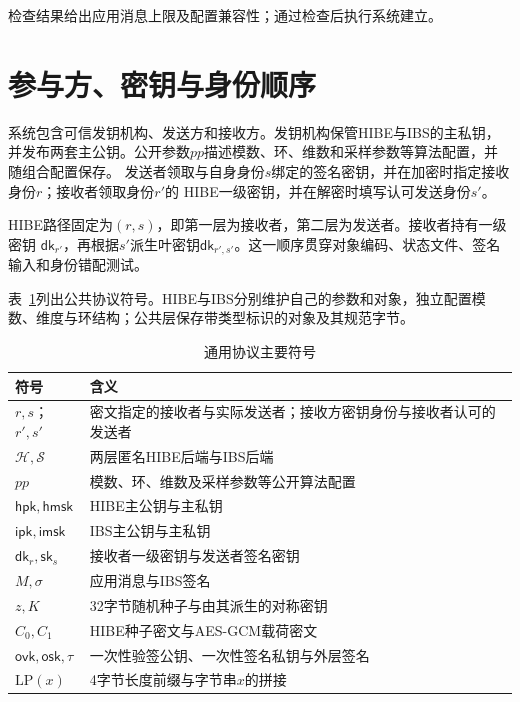 检查结果给出应用消息上限及配置兼容性；通过检查后执行系统建立。

\section{参与方、密钥与身份顺序}

系统包含可信发钥机构、发送方和接收方。发钥机构保管HIBE与IBS的主私钥，并发布两套主公钥。公开参数$pp$描述模数、环、维数和采样参数等算法配置，并随组合配置保存。
发送者领取与自身身份$s$绑定的签名密钥，并在加密时指定接收身份$r$；接收者领取身份$r'$的
HIBE一级密钥，并在解密时填写认可发送身份$s'$。

HIBE路径固定为$(r,s)$，即第一层为接收者，第二层为发送者。接收者持有一级密钥
$\mathsf{dk}_{r'}$，再根据$s'$派生叶密钥$\mathsf{dk}_{r',s'}$。这一顺序贯穿对象编码、状态文件、签名输入和身份错配测试。

表~\ref{tab:notations}列出公共协议符号。HIBE与IBS分别维护自己的参数和对象，独立配置模数、维度与环结构；公共层保存带类型标识的对象及其规范字节。

\begin{table}[H]
\centering\small
\caption{通用协议主要符号}
\label{tab:notations}
\begin{tabularx}{\textwidth}{@{}p{}X@{}}
\toprule
\rowcolor{black!8} 符号 & 含义 \\
\midrule
$r,s$；$r',s'$ & 密文指定的接收者与实际发送者；接收方密钥身份与接收者认可的发送者 \\
$\mathcal H,\mathcal S$ & 两层匿名HIBE后端与IBS后端 \\
$pp$ & 模数、环、维数及采样参数等公开算法配置 \\
$\mathsf{hpk},\mathsf{hmsk}$ & HIBE主公钥与主私钥 \\
$\mathsf{ipk},\mathsf{imsk}$ & IBS主公钥与主私钥 \\
$\mathsf{dk}_r,\mathsf{sk}_s$ & 接收者一级密钥与发送者签名密钥 \\
$M,\sigma$ & 应用消息与IBS签名 \\
$z,K$ & 32字节随机种子与由其派生的对称密钥 \\
$C_0,C_1$ & HIBE种子密文与AES-GCM载荷密文 \\
$\mathsf{ovk},\mathsf{osk},\tau$ & 一次性验签公钥、一次性签名私钥与外层签名 \\
$\mathrm{LP}(x)$ & 4字节长度前缀与字节串$x$的拼接 \\
\bottomrule
\end{tabularx}
\end{table}

